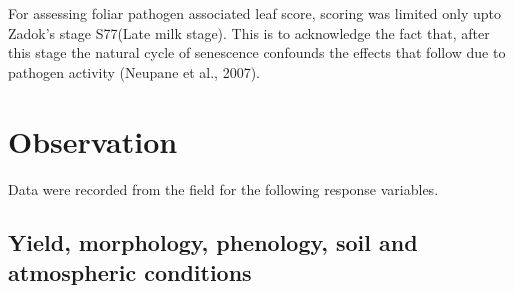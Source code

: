 \documentclass[12pt,oneside]{dukestatscithesis} %
\begin{document}
For assessing foliar pathogen associated leaf score, scoring was limited only upto Zadok's stage S77(Late milk stage). This is to acknowledge the fact that, after this stage the natural cycle of senescence confounds the effects that follow due to pathogen activity (Neupane et al., 2007).

\hypertarget{obs}{%
\section{Observation}\label{obs}}

Data were recorded from the field for the following response variables.

\hypertarget{yield-morphology-phenology-soil-and-atmospheric-conditions}{%
\subsection{Yield, morphology, phenology, soil and atmospheric conditions}\label{yield-morphology-phenology-soil-and-atmospheric-conditions}}
\end{document}
